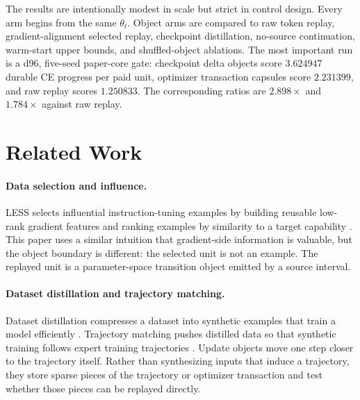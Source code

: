 \documentclass{article}
\begin{document}
The results are intentionally modest in scale but strict in control design.
Every arm begins from the same $\theta_t$. Object arms are compared to raw
token replay, gradient-alignment selected replay, checkpoint distillation,
no-source continuation, warm-start upper bounds, and shuffled-object
ablations. The most important run is a d96, five-seed paper-core gate:
checkpoint delta objects score $3.624947$ durable CE progress per paid unit,
optimizer transaction capsules score $2.231399$, and raw replay scores
$1.250833$. The corresponding ratios are $2.898\times$ and $1.784\times$
against raw replay.

\section{Related Work}

\paragraph{Data selection and influence.}
LESS selects influential instruction-tuning examples by building reusable
low-rank gradient features and ranking examples by similarity to a target
capability \citep{xia2024less}. This paper uses a similar intuition that
gradient-side information is valuable, but the object boundary is different:
the selected unit is not an example. The replayed unit is a parameter-space
transition object emitted by a source interval.

\paragraph{Dataset distillation and trajectory matching.}
Dataset distillation compresses a dataset into synthetic examples that train a
model efficiently \citep{wang2018datasetdistillation}. Trajectory matching
pushes distilled data so that synthetic training follows expert training
trajectories \citep{cazenavette2022trajectory}. Update objects move one step
closer to the trajectory itself. Rather than synthesizing inputs that induce a
trajectory, they store sparse pieces of the trajectory or optimizer
transaction and test whether those pieces can be replayed directly.
\end{document}
